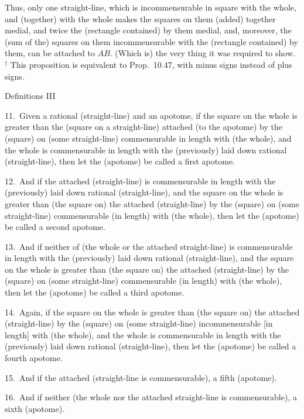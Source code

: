 Thus, only one straight-line, which is incommensurable
in square with the whole, and (together) with the whole makes the 
squares on them (added) together medial, and twice the (rectangle contained) by
them medial, and, moreover, the (sum of the)
squares on them incommensurable with the (rectangle contained)
by them, can be attached to $AB$. (Which is) the very thing it
was required to show.
{\footnotesize\noindent$^\dag$ This proposition is equivalent to 
Prop.~10.47, with minus signs instead of
plus signs.}


\begin{center}
{\large Definitions III}
\end{center}

11.~Given a rational (straight-line) and an apotome, if the square
on the whole is greater than the (square on a straight-line) attached (to the apotome) by the (square)
on (some straight-line) commensurable in length  with (the whole), and the
whole is commensurable in length with the 
(previously) laid down rational (straight-line), then let the (apotome) be
called a first apotome.

12.~And if the attached (straight-line)
is commensurable in length with the (previously) laid down rational
(straight-line), and the square on the whole is greater than (the
square on) the attached (straight-line) by the (square) on (some
straight-line) commensurable (in length) with (the whole), then let
the (apotome) be called a second apotome.

13.~And if neither of (the whole
or the attached straight-line) is commensurable
in length with the (previously) laid down rational (straight-line),
and the square on the whole is greater than (the
square on) the attached (straight-line) by the (square) on (some
straight-line) commensurable (in length) with (the whole), then let
the (apotome) be called a third apotome.

14.~Again, if the square
on the whole is greater than (the square on) the attached (straight-line) by the (square)
on (some straight-line) incommensurable [in length]  with (the whole), and the
whole is commensurable in length with the
(previously) laid down rational (straight-line), then let the (apotome) be
called a fourth apotome.

15.~And if the
attached (straight-line is commensurable),   a fifth (apotome).

16.~And if neither (the whole
nor the attached straight-line is commensurable), a sixth (apotome).

